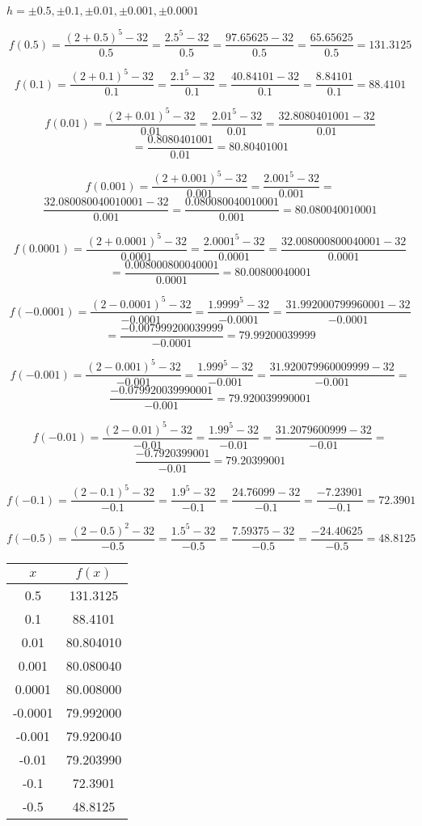 \documentclass{article}
\begin{document}
\begin{enumerate}
			$h = \pm 0.5, \pm 0.1, \pm 0.01, \pm 0.001, \pm 0.0001$
			
			$$f(0.5) = \frac{(2 + 0.5)^5 -32}{0.5} = \frac{2.5^5 - 32}{0.5} = \frac{97.65625 - 32}{0.5} = \frac{65.65625}{0.5} = 131.3125$$
			
			$$f(0.1) = \frac{(2 + 0.1)^5 - 32}{0.1} = \frac{2.1^5 -32}{0.1} = \frac{40.84101 - 32}{0.1} = \frac{8.84101}{0.1} = 88.4101$$
			
			$$f(0.01) = \frac{(2 + 0.01)^5 - 32}{0.01} = \frac{2.01^5 - 32}{0.01} = \frac{32.8080401001 - 32}{0.01} $$
			$$= \frac{0.8080401001}{0.01} = 80.80401001$$
			
			$$f(0.001) = \frac{(2+ 0.001)^5 - 32}{0.001} = \frac{2.001^5 - 32}{0.001} = $$
			$$\frac{32.080080040010001 - 32}{0.001} = \frac{0.080080040010001}{0.001} = 80.080040010001$$
			
			$$f(0.0001) = \frac{(2 + 0.0001)^5 - 32}{0.0001} = \frac{2.0001^5  - 32}{0.0001} = \frac{32.008000800040001 - 32}{0.0001} $$
			$$= \frac{0.008000800040001}{0.0001} = 80.00800040001$$
			
			$$f(-0.0001) = \frac{(2 - 0.0001)^5 - 32}{-0.0001}  = \frac{1.9999^5 - 32}{-0.0001} = \frac{31.992000799960001-32}{-0.0001}$$
			$$ = \frac{-0.007999200039999}{-0.0001} = 79.99200039999$$
			
			$$f(-0.001) = \frac{(2 - 0.001)^5 - 32}{-0.001}  =\frac{1.999^5 - 32}{-0.001} = \frac{31.920079960009999 - 32}{-0.001} = $$
			$$\frac{-0.079920039990001}{-0.001} = 79.920039990001$$
			
			$$f(-0.01) = \frac{(2-0.01)^5 - 32}{-0.01} = \frac{1.99^5 - 32}{-0.01} = \frac{31.2079600999 - 32}{-0.01} = $$
			$$\frac{-0.7920399001}{-0.01} = 79.20399001$$
			
			$$f(-0.1) = \frac{(2- 0.1)^5 - 32}{-0.1} = \frac{1.9^5 - 32}{-0.1} = \frac{24.76099 -32}{-0.1} = \frac{-7.23901}{-0.1} = 72.3901$$
			
			$$f(-0.5) = \frac{(2- 0.5)^2 - 32}{-0.5} = \frac{1.5^5 -32}{-0.5} = \frac{7.59375 - 32}{-0.5} = \frac{-24.40625}{-0.5} = 48.8125$$
			
			\begin{center}
				\begin{tabular}{|c|c|}
				\hline
				$x$ & $f(x)$ \\
				\hline \hline
				0.5 &  131.3125 \\
				0.1 & 88.4101 \\
				0.01 &  80.804010 \\
				0.001 &   80.080040 \\
				0.0001 & 80.008000 \\
				-0.0001 &  79.992000 \\
				-0.001 & 79.920040 \\
				-0.01 & 79.203990 \\
				-0.1 &  72.3901 \\
				-0.5 & 48.8125 \\
				\hline
				\end{tabular}
			\end{center}
			

\end{enumerate}
\end{document}
